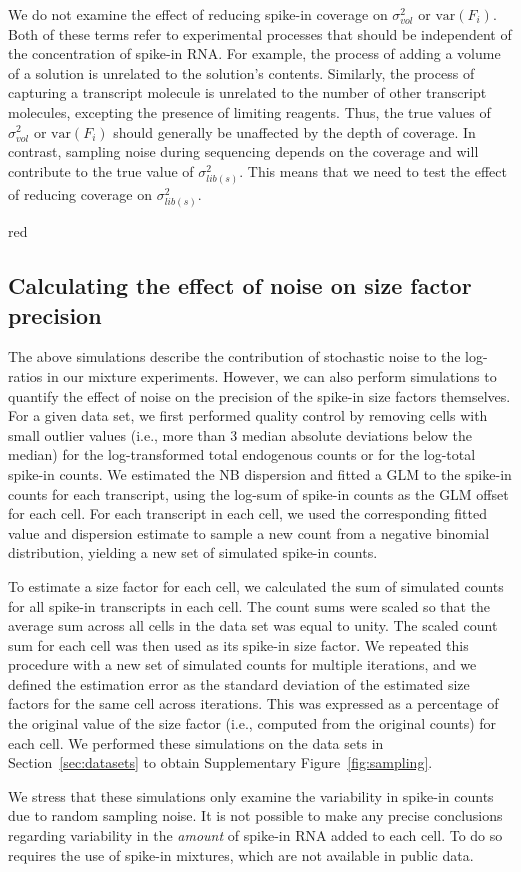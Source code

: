\documentclass{article}
\newcommand\variance{\mbox{var}}
\begin{document}
We do not examine the effect of reducing spike-in coverage on $\sigma^2_{vol}$ or $\variance(F_i)$.
Both of these terms refer to experimental processes that should be independent of the concentration of spike-in RNA.
For example, the process of adding a volume of a solution is unrelated to the solution's contents.
Similarly, the process of capturing a transcript molecule is unrelated to the number of other transcript molecules, excepting the presence of limiting reagents.
Thus, the true values of $\sigma^2_{vol}$ or $\variance(F_i)$ should generally be unaffected by the depth of coverage.
In contrast, sampling noise during sequencing depends on the coverage and will contribute to the true value of $\sigma^2_{lib(s)}$.
This means that we need to test the effect of reducing coverage on $\sigma^2_{lib(s)}$.

\begin{color}{red}
\subsection{Calculating the effect of noise on size factor precision}
The above simulations describe the contribution of stochastic noise to the log-ratios in our mixture experiments.
However, we can also perform simulations to quantify the effect of noise on the precision of the spike-in size factors themselves.
For a given data set, we first performed quality control by removing cells with small outlier values (i.e., more than 3 median absolute deviations below the median) for the log-transformed total endogenous counts or for the log-total spike-in counts.
We estimated the NB dispersion and fitted a GLM to the spike-in counts for each transcript, using the log-sum of spike-in counts as the GLM offset for each cell.
For each transcript in each cell, we used the corresponding fitted value and dispersion estimate to sample a new count from a negative binomial distribution, yielding a new set of simulated spike-in counts.

To estimate a size factor for each cell, we calculated the sum of simulated counts for all spike-in transcripts in each cell.
The count sums were scaled so that the average sum across all cells in the data set was equal to unity.
The scaled count sum for each cell was then used as its spike-in size factor.
We repeated this procedure with a new set of simulated counts for multiple iterations, and we defined the estimation error as the standard deviation of the estimated size factors for the same cell across iterations. 
This was expressed as a percentage of the original value of the size factor (i.e., computed from the original counts) for each cell.
We performed these simulations on the data sets in Section~\ref{sec:datasets} to obtain Supplementary Figure~\ref{fig:sampling}.

We stress that these simulations only examine the variability in spike-in counts due to random sampling noise. 
It is not possible to make any precise conclusions regarding variability in the \textit{amount} of spike-in RNA added to each cell.
To do so requires the use of spike-in mixtures, which are not available in public data.
\end{color}
\end{document}
